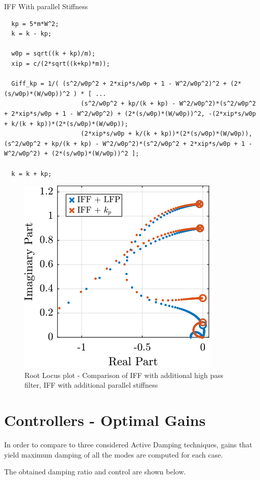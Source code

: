 \documentclass[a4paper, 10pt, DIV=12, parskip=full]{scrreprt}
\begin{document}
IFF With parallel Stiffness
\begin{verbatim}
  kp = 5*m*W^2;
  k = k - kp;

  w0p = sqrt((k + kp)/m);
  xip = c/(2*sqrt((k+kp)*m));

  Giff_kp = 1/( (s^2/w0p^2 + 2*xip*s/w0p + 1 - W^2/w0p^2)^2 + (2*(s/w0p)*(W/w0p))^2 ) * [ ...
                     (s^2/w0p^2 + kp/(k + kp) - W^2/w0p^2)*(s^2/w0p^2 + 2*xip*s/w0p + 1 - W^2/w0p^2) + (2*(s/w0p)*(W/w0p))^2, -(2*xip*s/w0p + k/(k + kp))*(2*(s/w0p)*(W/w0p));
                     (2*xip*s/w0p + k/(k + kp))*(2*(s/w0p)*(W/w0p)), (s^2/w0p^2 + kp/(k + kp) - W^2/w0p^2)*(s^2/w0p^2 + 2*xip*s/w0p + 1 - W^2/w0p^2) + (2*(s/w0p)*(W/w0p))^2 ];

  k = k + kp;
\end{verbatim}

\begin{figure}[htbp]
\centering
\includegraphics[scale=1]{figs/comp_root_locus.png}
\caption{\label{fig:comp_root_locus}Root Locus plot - Comparison of IFF with additional high pass filter, IFF with additional parallel stiffness}
\end{figure}

\section{Controllers - Optimal Gains}
\label{sec:org1889cfc}
In order to compare to three considered Active Damping techniques, gains that yield maximum damping of all the modes are computed for each case.

The obtained damping ratio and control are shown below.
\end{document}
